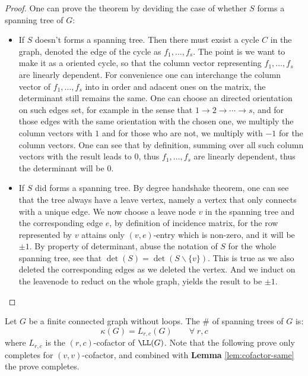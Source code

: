 \begin{proof}
	One can prove the theorem by deviding the case of whether \( S \) forms a spanning tree of \( G \):
	\begin{itemize}
		\item If \( S \) doesn't forms a spanning tree. Then there must exsist a cycle \( C \) in the graph, denoted the edge of the cycle as \( f_1, \ldots, f_s \). The point is we want to make it as a oriented cycle, so that the column vector representing \( f_1, \ldots, f_s \) are linearly dependent. For convenience one can interchange the column vector of \( f_1,\ldots, f_s \) into in order and adacent ones on the matrix, the determinant still remains the same. One can choose an directed orientation on such edges set, for example in the sense that \( 1\to2\to \cdots\to s \), and for those edges with the same orientation with the chosen one, we multiply the column vectors with \( 1 \) and for those who are not, we multiply with \( -1 \) for the column vectors. One can see that by definition, summing over all such column vectors with the result leads to \( 0 \), thus \( f_1, \ldots, f_s \) are linearly dependent, thus the determinant will be \( 0 \).
		\item If \( S \) did forms a spanning tree. By degree handshake theorem, one can see that the tree always have a leave vertex, namely a vertex that only connects with a unique edge. We now choose a leave node \( v \) in the spanning tree and the corresponding edge \( e \), by definition of incidence matrix, for the row represented by \( v \) attains only \( (v,e) \)-entry which is non-zero, and it will be \( \pm 1 \). By property of determinant, abuse the notation of \( S \) for the whole spanning tree, see that \( \det(S) = \det(S \backslash \{v\}) \). This is true as we also deleted the corresponding edges as we deleted the vertex. And we induct on the leavenode to reduct on the whole graph, yields the result to be \( \pm 1 \).
	\end{itemize}
\end{proof}

\begin{theorem}
	Let \( G \) be a finite connected graph without loops. The \# of spanning trees of \( G \) is:
	\[
		\kappa(G) = L_{r,c}(G) \qquad \forall \; r,c
	\]
	where \( L_{r,c} \) is the \( (r,c) \)-cofactor of \( \LL(G) \). Note that the following prove only completes for \( (v,v) \)-cofactor, and combined with \textbf{Lemma} \ref{lem:cofactor-same} the prove completes.
\end{theorem}
